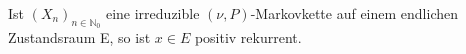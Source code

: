 \label{irr. Markovkette x positiv rekurrent}
Ist $(X_{n})_{n \in \mathbb{N}_{0}}$ eine irreduzible $(\nu,P)$-Markovkette auf einem endlichen Zustandsraum E, so ist $x \in E$ positiv rekurrent.